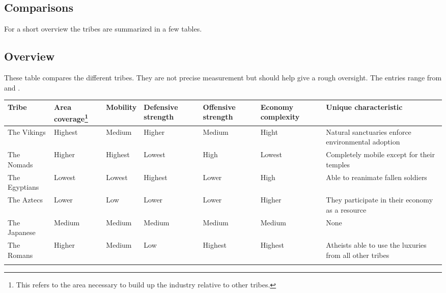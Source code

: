 \newpage{}
\begin{landscape}

	\section{Comparisons}\label{ch:Tribes:Comparisons}
	For a short overview the tribes are summarized in a few tables.

	\subsection{Overview}
	These table compares the different tribes. They are not precise measurement but
	should help give a rough oversight. The entries range from 
	   
	 and .

	\begin{longtable}{p{3cm}p{1.5cm}p{1.5cm}p{1.5cm}p{1.5cm}p{1.8cm}p{6.2cm}}
		\toprule{}
		Tribe
		  & Area coverage\footnote{
			This refers to the area necessary to build up the industry relative to
			other tribes.
		} & Mobility
		  & Defensive strength                                      & Offensive strength
		  & Economy complexity
		  & Unique characteristic                                                        \\
		\midrule{}
		The \gls{Vikings}
		  & Highest                                                 & Medium
		  & Higher                                                  & Medium
		  & Hight
		  & Natural sanctuaries enforce environmental adoption
		\\
		The \gls{Nomads}
		  & Higher                                                  & Highest
		  & Lowest                                                  & High
		  & Lowest
		  & Completely mobile except for their temples
		\\
		The \gls{Egyptians}
		  & Lowest                                                  & Lowest
		  & Highest                                                 & Lower
		  & High
		  & Able to reanimate fallen soldiers
		\\
		The \gls{Aztecs}
		  & Lower                                                   & Low
		  & Lower                                                   & Lower
		  & Higher
		  & They participate in their economy as a resource
		\\
		The \gls{Japanese}
		  & Medium                                                  & Medium
		  & Medium                                                  & Medium
		  & Medium
		  & None
		\\
		The \gls{Romans}
		  & Higher                                                  & Medium
		  & Low                                                     & Highest
		  & Highest
		  & Atheists able to use the luxuries from all other tribes
		\\
		\bottomrule{}
	\end{longtable}


\end{landscape}
